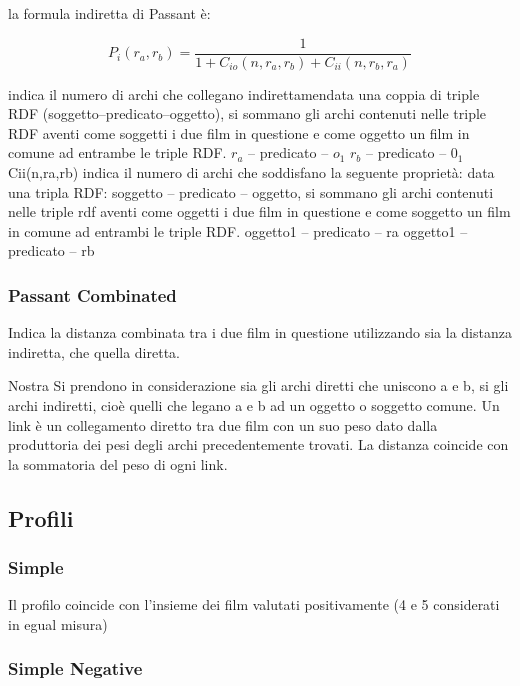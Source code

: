 la formula indiretta di Passant è:

    \begin{equation}
        P_{i}(r_{a},r_{b}) = \frac{1} {1+C_{io}(n,r_{a},r_{b})+C_{ii}(n,r_{b},r_{a})}
    \end{equation}

indica il numero di archi che collegano indirettamendata una coppia di triple RDF (soggetto–predicato–oggetto), si sommano gli archi contenuti nelle triple RDF aventi come soggetti i due film in questione e come oggetto un film in comune ad entrambe le triple RDF.
$r_a$ – predicato – $o_1$
$r_b$ – predicato – $0_1$
Cii(n,ra,rb) indica il numero di archi che soddisfano la seguente proprietà:
data una tripla RDF: soggetto – predicato – oggetto, si sommano gli archi contenuti nelle triple rdf aventi come oggetti i due film in questione e come soggetto un film in comune ad entrambi le triple RDF.
oggetto1 – predicato – ra
oggetto1 – predicato – rb



\subsubsection{Passant Combinated}
Indica la distanza combinata tra i due film in questione utilizzando sia la distanza indiretta, che quella diretta.

Nostra
Si prendono in considerazione sia gli archi diretti che uniscono a e b, si gli archi indiretti, cioè quelli che legano a e b ad un oggetto o soggetto comune.
Un link è un collegamento diretto tra due film con un suo peso dato dalla produttoria dei pesi degli archi precedentemente trovati.
La distanza coincide con la sommatoria del peso di ogni link.



\subsection{Profili}

\subsubsection{Simple}
Il profilo coincide con l'insieme dei film valutati positivamente (4 e 5 considerati in egual misura)

\subsubsection{Simple Negative}

